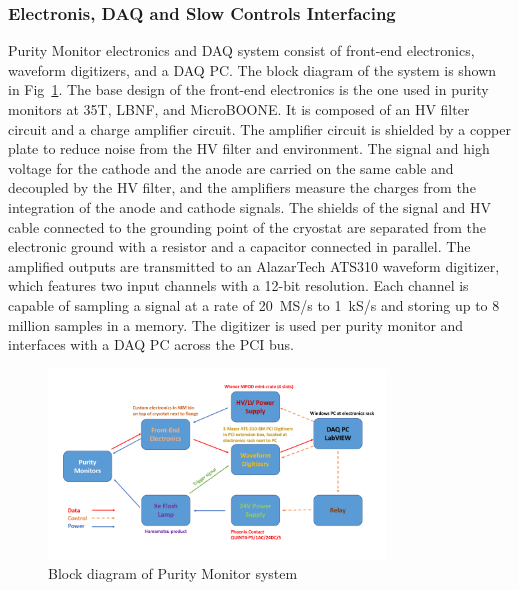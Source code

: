 

\subsubsection{Electronis, DAQ and Slow Controls Interfacing}

Purity Monitor electronics and DAQ system consist of front-end electronics, waveform digitizers, and a DAQ PC. The block diagram of the system is shown in Fig~\ref{fig:diagram}. The base design of the front-end electronics is the one used in purity monitors at 35T, LBNF, and MicroBOONE. It is composed of an HV filter circuit and a charge amplifier circuit. The amplifier circuit is shielded by a copper plate to reduce noise from the HV filter and environment. The signal and high voltage for the cathode and the anode are carried on the same cable and decoupled by the HV filter, and the amplifiers measure the charges from the integration of the anode and cathode signals. The shields of the signal and HV cable connected to the grounding point of the cryostat are separated from the electronic ground with a resistor and a capacitor connected in parallel. The amplified outputs are transmitted to an AlazarTech ATS310 waveform digitizer, which features two input channels with a 12-bit resolution. Each channel is capable of sampling a signal at a rate of 20~MS/s to 1~kS/s and storing up to 8 million samples in a memory. The digitizer is used per purity monitor and interfaces with a DAQ PC across the PCI bus.


\begin{figure}[h]
	\centering
	\includegraphics[width=0.8\textwidth]{../figures/PrMon_BlockDiagram.pdf}
	\caption{Block diagram of Purity Monitor system}
	\label{fig:diagram}
\end{figure}

